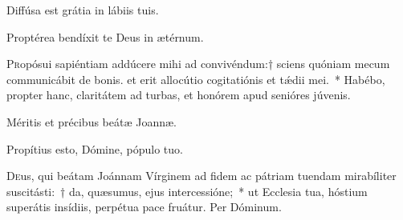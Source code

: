 \documentclass[vesperale_romanum.tex]{subfiles}
\begin{document}
\admagnificat


\vv Diffúsa est grátia in lábiis tuis.

\rr Proptérea bendíxit te Deus in ætérnum.

\quadcommferiae

\myrule











\lettrine{P}{r}opósui sapiéntiam addúcere mihi ad convivéndum:† sciens quóniam mecum communicábit de bonis. et erit allocútio cogitatiónis et tǽdii mei.~* Habébo, pro\-pter hanc, claritátem ad turbas, et honórem apud senióres júvenis.

\hymnus 


\vv Méritis et précibus beátæ Joannæ. \tpalleluia

\rr Propítius esto, Dómine, pópulo tuo. \tpalleluia

\admagnificat


\oratio

\lettrine{D}{e}us, qui beátam Joánnam Vírginem ad fidem ac pátriam tuendam mirabíliter suscitásti:~† da, quæsumus, ejus intercessióne;~* ut Ecclesia tua, hóstium superátis insídiis, perpétua pace fruátur. Per Dóminum.


\end{document}
